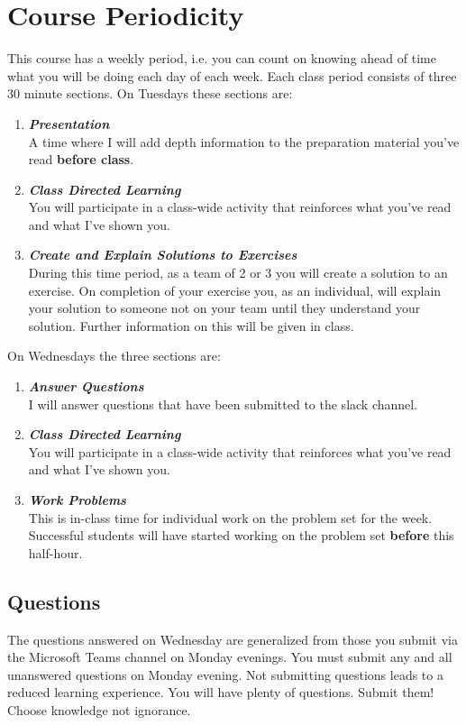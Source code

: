 \documentclass[12pt]{amsart}
\begin{document}
\section{Course Periodicity}
This course has a weekly period, i.e. you can count on knowing ahead of time what you will be doing each day of each week.
Each class period consists of three 30 minute sections. On Tuesdays these sections are:
\begin{enumerate}
	\item \textit{\textbf{Presentation}} \\A time where I will add depth information to the preparation material you've read \textbf{before class}. 
	\item \textit{\textbf{Class Directed Learning}}\\You will participate in a class-wide activity that reinforces what you've read and what I've shown you.
	\item \textit{\textbf{Create and Explain Solutions to Exercises}}\\During this time period, as a team of 2 or 3 you will create a solution to an exercise. On completion of your exercise you, as an individual, will explain your solution to someone not on your team until they understand your solution. Further information on this will be given in class.
\end{enumerate}
On Wednesdays the three sections are:
\begin{enumerate}
	\item \textit{\textbf{Answer Questions}}\\ I will answer questions that have been submitted to the slack channel.
	\item \textit{\textbf{Class Directed Learning}}\\You will participate in a class-wide activity that reinforces what you've read and what I've shown you.
	\item \textit{\textbf{Work Problems}}\\This is in-class time for individual work on the problem set for the week. Successful students will have started working on the problem set \textbf{before} this half-hour.
\end{enumerate}

\subsection{Questions} The questions answered on Wednesday are generalized from those you submit via the Microsoft Teams channel on Monday evenings. You must submit any and all unanswered questions on Monday evening. Not submitting questions leads to a reduced learning experience. You will have plenty of questions. Submit them! Choose knowledge not ignorance.
\end{document}
